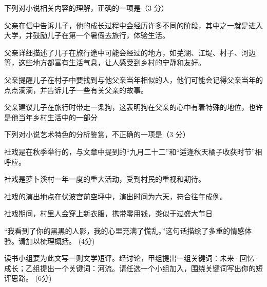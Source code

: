 \documentclass[zihao = -4]{exam-zh}
\begin{document}
       \begin{question}
         下列对小说相关内容的理解，正确的一项是（3 分）
         \begin{choices}
           \item  父亲在信中告诉儿子，他的成长过程中会经历许多不同的阶段，其中之一就是进入大学，并鼓励儿子在第一个暑假去旅行，体验生活。

           \item  父亲详细描述了儿子在旅行途中可能会经过的地方，如芜湖、江堤、村子、河边等，这些地方都富有生活气息，让人感受到乡村的宁静和友好。

           \item  父亲提醒儿子在村子中要找到与他父亲当年相似的人，他们可能会记得父亲当年的点点滴滴，并告诉儿子一些有关父亲的故事。

           \item  父亲建议儿子在旅行时带走一条狗，这表明狗在父亲的心中有着特殊的地位，也许是他当年乡村生活中的一部分

         \end{choices}
       \end{question}

       \begin{question}
         下列对小说艺术特色的分析鉴赏，不正确的一项是（3 分）
         \begin{choices}
           \item  社戏是在秋季举行的，与文章中提到的“九月二十二”和“适逢秋天橘子收获时节”相呼应。 

           \item  社戏是萝卜溪村一年一度的重大活动，受到村民的重视和期待。 

           \item  社戏的演出地点在伏波宫前空坪中，演出时间为六天，符合往年成例。 

           \item  社戏期间，村里人会穿上新衣服，携带零用钱，类似于过盛大节日
  
         \end{choices}
       \end{question}

       \begin{question}
         “我看到了你的黑黑的人影，我的心里充满了慌乱。”这句话描绘了多重的情感体验。请加以梳理概括。
(4分)
       \end{question}

       \begin{question}
         读书小组要为此文写一则文学短评。经讨论，甲组提出一组关键词：未来·回忆·成长；乙组提出一个关键词：河流。请任选一个小组加入，围绕关键词写出你的短评思路。
(6分)
       \end{question}
\end{document}
